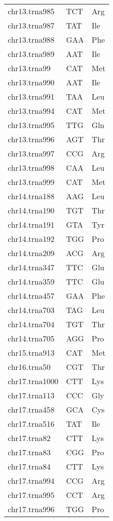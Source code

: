\begin{longtable}{@{}l>{\collectcell\anticodon}l<{\endcollectcell}l@{}}
    chr13.trna985 & TCT & Arg \\
    chr13.trna987 & TAT & Ile \\
    chr13.trna988 & GAA & Phe \\
    chr13.trna989 & AAT & Ile \\
    chr13.trna99 & CAT & Met \\
    chr13.trna990 & AAT & Ile \\
    chr13.trna991 & TAA & Leu \\
    chr13.trna994 & CAT & Met \\
    chr13.trna995 & TTG & Gln \\
    chr13.trna996 & AGT & Thr \\
    chr13.trna997 & CCG & Arg \\
    chr13.trna998 & CAA & Leu \\
    chr13.trna999 & CAT & Met \\
    chr14.trna188 & AAG & Leu \\
    chr14.trna190 & TGT & Thr \\
    chr14.trna191 & GTA & Tyr \\
    chr14.trna192 & TGG & Pro \\
    chr14.trna209 & ACG & Arg \\
    chr14.trna347 & TTC & Glu \\
    chr14.trna359 & TTC & Glu \\
    chr14.trna457 & GAA & Phe \\
    chr14.trna703 & TAG & Leu \\
    chr14.trna704 & TGT & Thr \\
    chr14.trna705 & AGG & Pro \\
    chr15.trna913 & CAT & Met \\
    chr16.trna50 & CGT & Thr \\
    chr17.trna1000 & CTT & Lys \\
    chr17.trna113 & CCC & Gly \\
    chr17.trna458 & GCA & Cys \\
    chr17.trna516 & TAT & Ile \\
    chr17.trna82 & CTT & Lys \\
    chr17.trna83 & CGG & Pro \\
    chr17.trna84 & CTT & Lys \\
    chr17.trna994 & CCG & Arg \\
    chr17.trna995 & CCT & Arg \\
    chr17.trna996 & TGG & Pro \\

\end{longtable}

